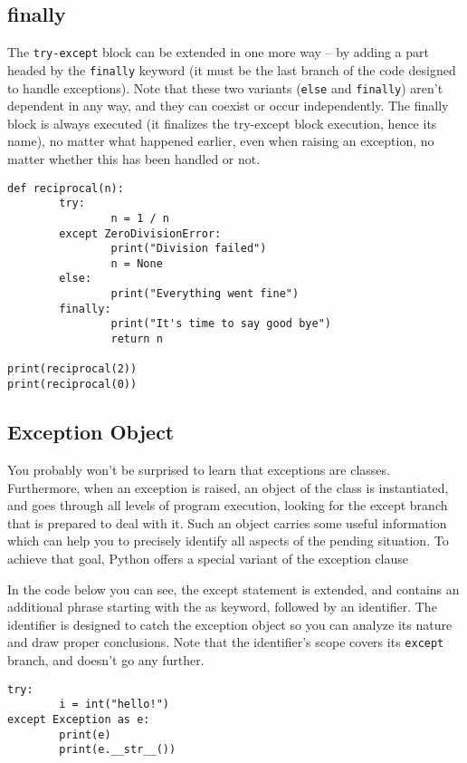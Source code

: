 \documentclass[11pt]{article}
\begin{document}
\subsection{finally}
\label{sec:org2d925b2}
The \texttt{try-except} block can be extended in one more way – by adding a
part headed by the \texttt{finally} keyword (it must be the last branch of
the code designed to handle exceptions). Note that these two variants
(\texttt{else} and \texttt{finally}) aren’t dependent in any way, and they can
coexist or occur independently. The finally block is always executed
(it finalizes the try-except block execution, hence its name), no
matter what happened earlier, even when raising an exception, no
matter whether this has been handled or not.

\begin{verbatim}
def reciprocal(n):
        try:
                n = 1 / n
        except ZeroDivisionError:
                print("Division failed")
                n = None
        else:
                print("Everything went fine")
        finally:
                print("It's time to say good bye")
                return n

print(reciprocal(2))
print(reciprocal(0))
\end{verbatim}

\subsection{Exception Object}
\label{sec:org75d5f0f}
You probably won’t be surprised to learn that exceptions are
classes. Furthermore, when an exception is raised, an object of the
class is instantiated, and goes through all levels of program
execution, looking for the except branch that is prepared to deal with
it.  Such an object carries some useful information which can help you
to precisely identify all aspects of the pending situation. To achieve
that goal, Python offers a special variant of the exception clause

In the code below you can see, the except statement is extended, and
contains an additional phrase starting with the as keyword, followed
by an identifier. The identifier is designed to catch the exception
object so you can analyze its nature and draw proper conclusions. Note
that the identifier’s scope covers its \texttt{except} branch, and doesn’t go
any further.

\begin{verbatim}
try:
        i = int("hello!")
except Exception as e:
        print(e)
        print(e.__str__())

\end{verbatim}
\end{document}
